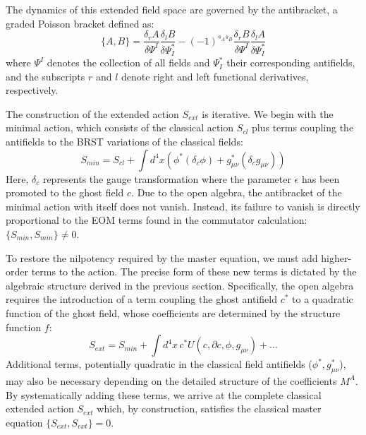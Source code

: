 \documentclass[twocolumn]{aastex631}
\begin{document}
The dynamics of this extended field space are governed by the antibracket, a graded Poisson bracket defined as:
\begin{equation}
\{A, B\} = \frac{\delta_r A}{\delta \Psi^I} \frac{\delta_l B}{\delta \Psi^*_I} - (-1)^{s_A s_B} \frac{\delta_r B}{\delta \Psi^I} \frac{\delta_l A}{\delta \Psi^*_I}
\end{equation}
where $\Psi^I$ denotes the collection of all fields and $\Psi^*_I$ their corresponding antifields, and the subscripts $r$ and $l$ denote right and left functional derivatives, respectively.

The construction of the extended action $S_{ext}$ is iterative. We begin with the minimal action, which consists of the classical action $S_{cl}$ plus terms coupling the antifields to the BRST variations of the classical fields:
\begin{equation}
S_{min} = S_{cl} + \int d^4x \left( \phi^* (\delta_c \phi) + g_{\mu\nu}^* (\delta_c g_{\mu\nu}) \right)
\end{equation}
Here, $\delta_c$ represents the gauge transformation where the parameter $\epsilon$ has been promoted to the ghost field $c$. Due to the open algebra, the antibracket of the minimal action with itself does not vanish. Instead, its failure to vanish is directly proportional to the EOM terms found in the commutator calculation: $\{S_{min}, S_{min}\} \neq 0$.

To restore the nilpotency required by the master equation, we must add higher-order terms to the action. The precise form of these new terms is dictated by the algebraic structure derived in the previous section. Specifically, the open algebra requires the introduction of a term coupling the ghost antifield $c^*$ to a quadratic function of the ghost field, whose coefficients are determined by the structure function $f$:
\begin{equation}
S_{ext} = S_{min} + \int d^4x \, c^* U(c, \partial c, \phi, g_{\mu\nu}) + \dots
\end{equation}
Additional terms, potentially quadratic in the classical field antifields ($\phi^*, g_{\mu\nu}^*$), may also be necessary depending on the detailed structure of the coefficients $M^A$. By systematically adding these terms, we arrive at the complete classical extended action $S_{ext}$ which, by construction, satisfies the classical master equation $\{S_{ext}, S_{ext}\} = 0$.
\end{document}

